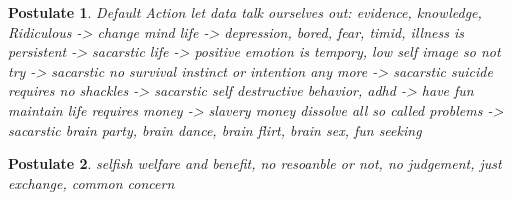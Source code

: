 \documentclass{article}
\newtheorem{postulate}{Postulate}
\begin{document}
\begin{postulate}
    Default Action
    let data talk ourselves out:  evidence, knowledge, Ridiculous -> change mind
    life -> depression, bored, fear, timid, illness is persistent -> sacarstic
    life -> positive emotion is tempory, low self image so not  try -> sacarstic
    no survival instinct or intention any more -> sacarstic
    suicide requires no shackles -> sacarstic
    self destructive behavior, adhd -> have fun
    maintain life requires money -> slavery
    money dissolve all so called problems -> sacarstic
    brain party, brain dance, brain flirt, brain sex, fun seeking
\end{postulate}

\begin{postulate}
    selfish welfare and benefit,
    no resoanble or not,
    no  judgement,
    just exchange,
    common concern
\end{postulate}
\end{document}
